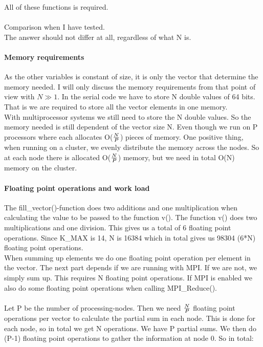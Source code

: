 \documentclass{article}
\begin{document}
All of these functions is required. \\ \\

Comparison when I have tested. \\
The answer should not differ at all, regardless of what N is.


 

\paragraph*{Memory requirements} 
As the other variables is constant of size, it is only the vector that determine the memory needed. I will only discuss the memory requirements from that point of view with $N\gg1$. In the serial code we have to store N double values of 64 bits. That is we are required to store all the vector elements in one memory.\\

With multiprocessor systems we still need to store the N double values. So the memory needed is still dependent of the vector size N. Even though we run on P processors where each allocates O($N \over P$) pieces of memory. One positive thing, when running on a cluster, we evenly distribute the memory across the nodes. So at each node there is allocated O($N \over P$) memory, but we need in total O(N) memory on the cluster. \\

\paragraph*{Floating point operations and work load} 
The fill\_vector()-function does two additions and one multiplication when calculating the value to be passed to the function v(). The function v() does two multiplications and one division. This gives us a total of 6 floating point operations. Since K\_MAX is 14, N is 16384 which in total gives us 98304 (6*N) floating point operations.  \\ 

When summing up elements we do one floating point operation per element in the vector. The next part depends if we are running with MPI. If we are not, we simply sum up. This requires N floating point operations. If MPI
is enabled we also do some floating point operations when calling MPI\_Reduce(). \\ \\

Let P be the number of processing-nodes. Then we need $N \over P$ floating point operations per vector to calculate the partial sum in each node. This is done for each node, so in total we get N operations. We have P partial sums. We then do (P-1) floating point operations to gather the information at node 0. So in total:
\end{document}
